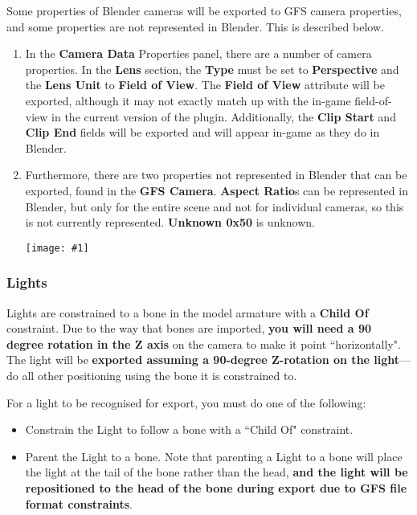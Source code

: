 \documentclass{article}
\newenvironment{guide}[1]
{
	\begin{center}
		\begin{tcolorbox}[%
			colback=black!20, 
			boxrule=0pt, 
			title=Step-by-step: #1,
			enhanced,
			breakable,
			overlay unbroken={%
                \draw[line width=1pt, black, rounded corners]
        	    (frame.north west) rectangle (frame.south east);
			},
    		overlay first={%
        		 \draw[line width=1pt, black, rounded corners]
        	    (frame.south west) -- (frame.north west) -- (frame.north east) -- (frame.south east);
                \draw[line width=1pt, black]
                (frame.south west) -- (frame.south east);
            },
    		overlay middle={%
                \draw[line width=1pt, black]
        	    (frame.north west) rectangle (frame.south east);
        	},
    		overlay last={%
                \draw[line width=1pt, black, rounded corners]
        	    (frame.north west) -- (frame.south west) -- (frame.south east) -- (frame.north east);
                \draw[line width=1pt, black]
                (frame.north west) -- (frame.north east);
           	}
        ]{}
    	\begin{enumerate}
}
{
    		\end{enumerate}
    	\end{tcolorbox}
	\end{center}  	 
}
\newcommand{\guideimage}[1]
{
	\begin{center}
		\texttt{[image: \#1]}
	\end{center}
}
\begin{document}
Some properties of Blender cameras will be exported to GFS camera properties, and some properties are not represented in Blender. This is described below.
\begin{guide}{Accessing Camera Properties}
\item In the \textbf{Camera Data} Properties panel, there are a number of camera properties. In the \textbf{Lens} section, the \textbf{Type} must be set to \textbf{Perspective} and the \textbf{Lens Unit} to \textbf{Field of View}. The \textbf{Field of View} attribute will be exported, although it may not exactly match up with the in-game field-of-view in the current version of the plugin. Additionally, the \textbf{Clip Start} and \textbf{Clip End} fields will be exported and will appear in-game as they do in Blender.
\item Furthermore, there are two properties not represented in Blender that can be exported, found in the \textbf{GFS Camera}. \textbf{Aspect Ratio}s can be represented in Blender, but only for the entire scene and not for individual cameras, so this is not currently represented. \textbf{Unknown 0x50} is unknown.
\guideimage{images/editing_models/edits_camera_properties.png}
\end{guide}

\subsubsection{Lights}
Lights are constrained to a bone in the model armature with a \textbf{Child Of} constraint. Due to the way that bones are imported, \textbf{you will need a 90 degree rotation in the Z axis} on the camera to make it point ``horizontally". The light will be \textbf{exported assuming a 90-degree Z-rotation on the light}---do all other positioning using the bone it is constrained to.

For a light to be recognised for export, you must do one of the following:
\begin{itemize}
\item Constrain the Light to follow a bone with a ``Child Of" constraint.
\item Parent the Light to a bone. Note that parenting a Light to a bone will place the light at the tail of the bone rather than the head, \textbf{and the light will be repositioned to the head of the bone during export due to GFS file format constraints}.
\end{itemize}
\end{document}

